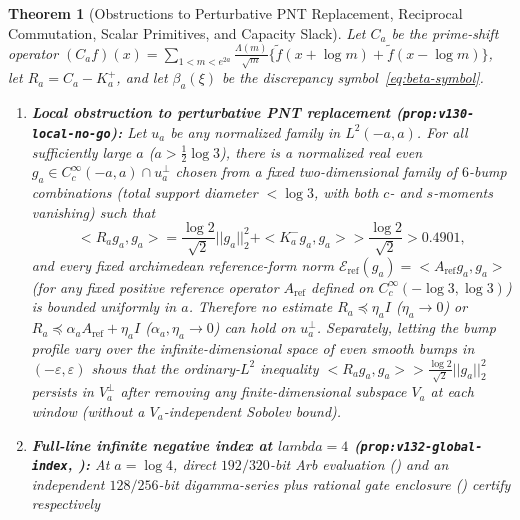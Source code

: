 \documentclass[11pt]{article}
\def\lambda{lambda}%
\def\norm#1{||#1||}%
\def\ip#1#2{<#1,#2>}%
\newtheorem{theorem}{Theorem}[section]
\theoremstyle{remark}
\newcommand{\norm}[1]{\left\lVert #1\right\rVert}
\newcommand{\ip}[2]{\left\langle #1,#2\right\rangle}
\begin{document}
\begin{theorem}[Obstructions to Perturbative PNT Replacement, Reciprocal Commutation, Scalar Primitives, and Capacity Slack]
\label{thm:concentration-obstructions}
Let $C_a$ be the prime-shift operator $(C_a f)(x) = \sum_{1<m<e^{2a}}\frac{\Lambda(m)}{\sqrt{m}}\{\widetilde{f}(x+\log m)+\widetilde{f}(x-\log m)\}$, let $R_a = C_a - K_a^+$, and let $\beta_a(\xi)$ be the discrepancy symbol~\eqref{eq:beta-symbol}.
\begin{enumerate}[label=(\alph*)]
  \item \textbf{Local obstruction to perturbative PNT replacement (\texttt{prop:v130-local-no-go}):} Let $u_a$ be any normalized family in $L^2(-a,a)$. For all sufficiently large $a$ ($a > \tfrac{1}{2}\log 3$), there is a normalized real even $g_a \in C_c^\infty(-a,a) \cap u_a^\perp$ chosen from a \emph{fixed two-dimensional family} of $6$-bump combinations (total support diameter $< \log 3$, with both $c$- and $s$-moments vanishing) such that
  \begin{equation}\label{eq:v130-local-no-go}
    \ip{R_a g_a}{g_a} = \frac{\log 2}{\sqrt{2}}\norm{g_a}_2^2 + \ip{K_a^- g_a}{g_a} > \frac{\log 2}{\sqrt{2}} > 0.4901,
  \end{equation}
  and every fixed archimedean reference-form norm $\mathcal{E}_{\mathrm{ref}}(g_a) = \ip{A_{\mathrm{ref}}g_a}{g_a}$ (for any fixed positive reference operator $A_{\mathrm{ref}}$ defined on $C_c^\infty(-\log 3, \log 3)$) is bounded uniformly in $a$. Therefore no estimate $R_a \preceq \eta_a I$ ($\eta_a \to 0$) or $R_a \preceq \alpha_a A_{\mathrm{ref}} + \eta_a I$ ($\alpha_a, \eta_a \to 0$) can hold on $u_a^\perp$. Separately, letting the bump profile vary over the infinite-dimensional space of even smooth bumps in $(-\varepsilon, \varepsilon)$ shows that the ordinary-$L^2$ inequality $\ip{R_a g_a}{g_a} > \frac{\log 2}{\sqrt{2}}\norm{g_a}_2^2$ persists in $V_a^\perp$ after removing any finite-dimensional subspace $V_a$ at each window (without a $V_a$-independent Sobolev bound).
  \item \textbf{Full-line infinite negative index at $\lambda = 4$ (\texttt{prop:v132-global-index}, ):} At $a = \log 4$, direct $192/320$-bit Arb evaluation () and an independent $128/256$-bit digamma-series plus rational gate enclosure () certify respectively
  \begin{equation}\label{eq:beta-log4-enclosures}
  \begin{aligned}

\end{aligned}
\end{equation}
\end{enumerate}
\end{theorem}
\end{document}

